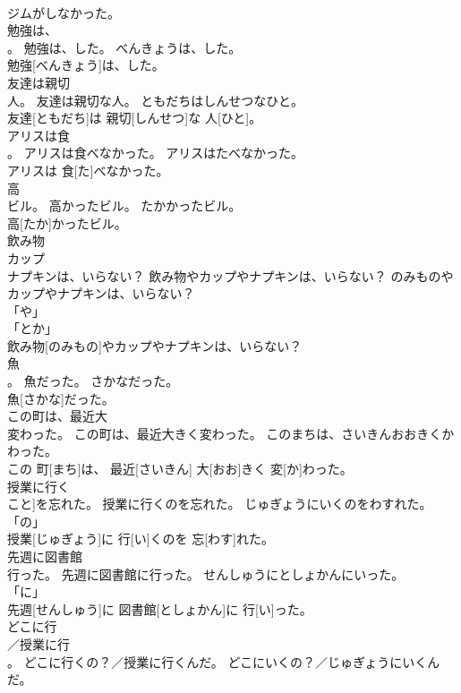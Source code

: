 \documentclass[8pt]{extreport}
\begin{document}
\begin{CJK}{UTF8}{min}
\\	ジムがしなかった。		
\\	勉強は、
\\	。	勉強は、した。	べんきょうは、した。	
\\	勉強[べんきょう]は、した。		
\\	友達は親切
\\	人。	友達は親切な人。	ともだちはしんせつなひと。	
\\	友達[ともだち]は 親切[しんせつ]な 人[ひと]。		
\\	アリスは食
\\	。	アリスは食べなかった。	アリスはたべなかった。	
\\	アリスは 食[た]べなかった。		
\\	高
\\	ビル。	高かったビル。	たかかったビル。	
\\	高[たか]かったビル。		
\\	飲み物
\\	カップ
\\	ナプキンは、いらない？	飲み物やカップやナプキンは、いらない？	のみものやカップやナプキンは、いらない？	
\\	「や」 
\\	「とか」 
\\	飲み物[のみもの]やカップやナプキンは、いらない？		
\\	魚
\\	。	魚だった。	さかなだった。	
\\	魚[さかな]だった。		
\\	この町は、最近大
\\	変わった。	この町は、最近大きく変わった。	このまちは、さいきんおおきくかわった。	
\\	この 町[まち]は、 最近[さいきん] 大[おお]きく 変[か]わった。		
\\	授業に行く
\\	こと]を忘れた。	授業に行くのを忘れた。	じゅぎょうにいくのをわすれた。	
\\	「の」 
\\	授業[じゅぎょう]に 行[い]くのを 忘[わす]れた。		
\\	先週に図書館
\\	行った。	先週に図書館に行った。	せんしゅうにとしょかんにいった。	
\\	「に」 
\\	先週[せんしゅう]に 図書館[としょかん]に 行[い]った。		
\\	どこに行
\\	／授業に行
\\	。	どこに行くの？／授業に行くんだ。	どこにいくの？／じゅぎょうにいくんだ。	

\end{CJK}
\end{document}
